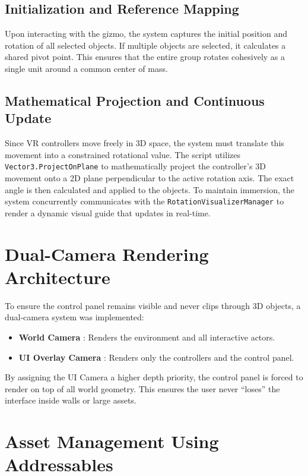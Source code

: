 \documentclass[inscr,ack,preface]{dithesis}
\begin{document}
\subsection{Initialization and Reference Mapping}
Upon interacting with the gizmo, the system captures the initial position and rotation of all selected objects.
If multiple objects are selected, it calculates a shared pivot point.
This ensures that the entire group rotates cohesively as a single unit around a common center of mass.

\subsection{Mathematical Projection and Continuous Update}
Since VR controllers move freely in 3D space, the system must translate this movement into a constrained rotational value.
The script utilizes \texttt{Vector3.ProjectOnPlane}
to mathematically project the controller's 3D movement onto a 2D plane perpendicular to the active rotation axis.
The exact angle is then calculated and applied to the objects. To maintain immersion,
the system concurrently communicates with the \texttt{RotationVisualizerManager} to render a dynamic visual guide
that updates in real-time.

\section{Dual-Camera Rendering Architecture}

To ensure the control panel remains visible and never clips through 3D objects, a dual-camera system was implemented:

\begin{itemize}
  \item \textbf{World Camera} : Renders the environment and all interactive actors.
  \item \textbf{UI Overlay Camera} : Renders only the controllers and the control panel.
\end{itemize}

By assigning the UI Camera a higher depth priority, the control panel is forced to render on top of all world geometry.
This ensures the user never ``loses'' the interface inside walls or large assets.

\section{Asset Management Using Addressables}
\end{document}
